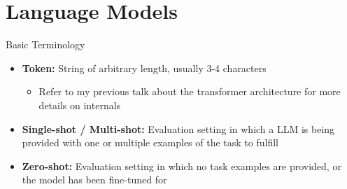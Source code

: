 \section{Language Models}

\begin{frame}[c]{Basic Terminology}
    \large
    \begin{itemize}[<+(1)->]
        \item   \textbf{Token:} String of arbitrary length, usually 3-4 characters
            \begin{itemize}
                \item Refer to my previous talk about the transformer architecture for more details on internals
            \end{itemize}
        \item   \textbf{Single-shot / Multi-shot:} Evaluation setting in which a \gls{LLM} is being provided with one or multiple examples of the task to fulfill
        \item   \textbf{Zero-shot:} Evaluation setting in which no task examples are provided, or the model has been fine-tuned for
    \end{itemize}
\end{frame}


